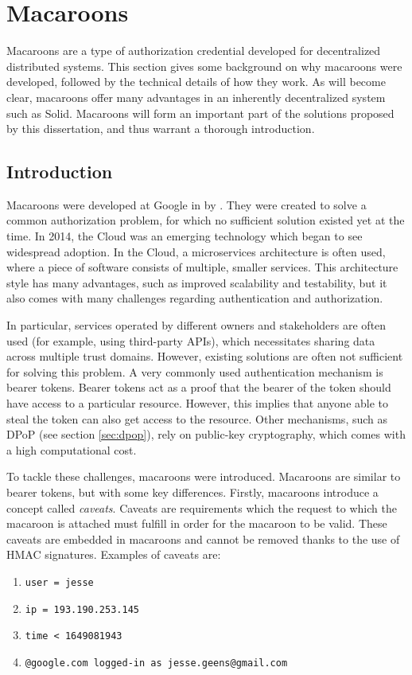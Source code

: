 \section{Macaroons}
\label{sec:macaroons}
Macaroons are a type of authorization credential developed for decentralized distributed systems. This section gives some background on why macaroons were developed, followed by the technical details of how they work. As will become clear, macaroons offer many advantages in an inherently decentralized system such as Solid. Macaroons will form an important part of the solutions proposed by this dissertation, and thus warrant a thorough introduction.

\subsection{Introduction}
\label{sec:macaroons-intro}
Macaroons were developed at Google in \citeyear{macaroons} by \citeauthor{macaroons}. They were created to solve a common authorization problem, for which no sufficient solution existed yet at the time. In 2014, the Cloud was an emerging technology which began to see widespread adoption. In the Cloud, a microservices architecture is often used, where a piece of software consists of multiple, smaller services. This architecture style has many advantages, such as improved scalability and testability, but it also comes with many challenges regarding authentication and authorization.

In particular, services operated by different owners and stakeholders are often used (for example, using third-party APIs), which necessitates sharing data across multiple trust domains. However, existing solutions are often not sufficient for solving this problem. A very commonly used authentication mechanism is bearer tokens. Bearer tokens act as a proof that the bearer of the token should have access to a particular resource. However, this implies that anyone able to steal the token can also get access to the resource. Other mechanisms, such as DPoP (see section \ref{sec:dpop}), rely on public-key cryptography, which comes with a high computational cost.

To tackle these challenges, macaroons were introduced. Macaroons are similar to bearer tokens, but with some key differences. Firstly, macaroons introduce a concept called \textit{caveats}. Caveats are requirements which the request to which the macaroon is attached must fulfill in order for the macaroon to be valid. These caveats are embedded in macaroons and cannot be removed thanks to the use of \acrshort{HMAC} signatures. Examples of caveats are:
\begin{enumerate}
    \itemsep0.1em 
    \item \texttt{user = jesse}
    \item \texttt{ip = 193.190.253.145}
    \item \texttt{time < 1649081943}
    \item \texttt{@google.com logged-in as jesse.geens@gmail.com}
\end{enumerate}

